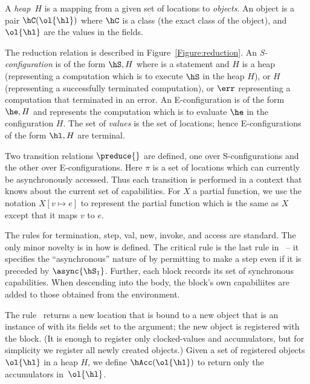 A {\em heap}~$H$ is a mapping from a given set of locations to {\em
  objects}. An object is a pair $\hC(\ol{\hl})$ where $\hC$ is a class (the exact
class of the object), and $\ol{\hl}$ are the values in the fields.

The reduction relation is described in
Figure~\ref{Figure:reduction}. An {\em S-configuration} is of the form
$\hS,H$ where \hS{} is a statement and $H$ is a heap (representing a
computation which is to execute $\hS$ in the heap $H$), or $H$
(representing a successfully terminated computation), or $\err$
representing a computation that terminated in an error. An
E-configuration is of the form $\he,H$ and represents the
computation which is to evaluate $\he$ in the configuration $H$. The
set of {\em values} is the set of locations; hence E-configurations of
the form $\hl,H$ are terminal.

Two transition relations $\preduce{}$ are defined, one over
S-configurations and the other over E-configurations. Here $\pi$ is a
set of locations which can currently be asynchronously accessed.  Thus
each transition is performed in a context that knows about the current
set of capabilities.  For $X$ a partial function, we use the notation
$X[v \mapsto e]$ to represent the partial function which is the same
as $X$ except that it maps $v$ to $e$.

The rules for termination, step, val, new, invoke, and access
are standard.  The only minor novelty is in how \hasync{} is
defined. The critical rule is the last rule in~ -- it
specifies the ``asynchronous'' nature of \hasync{} by permitting \hS{}
to make a step even if it is preceded by $\async{\hS_1}$. Further,
each block records its set of synchronous capabilities. When
descending into the body, the block's own capabiliites are added to
those obtained from the environment.

%
The rule~ returns a new location that is bound to a new
object that is an instance of \hC{} with its fields set to the argument;
    the new object is registered with the block.
(It is enough to register only clocked-values and accumulators, but
    for simplicity we register all newly created objects.)
Given a set of registered objects $\ol{\hl}$ in a heap $H$,
    we define
    $\hAcc(\ol{\hl})$ to return only the accumulators in~$\ol{\hl}$.



